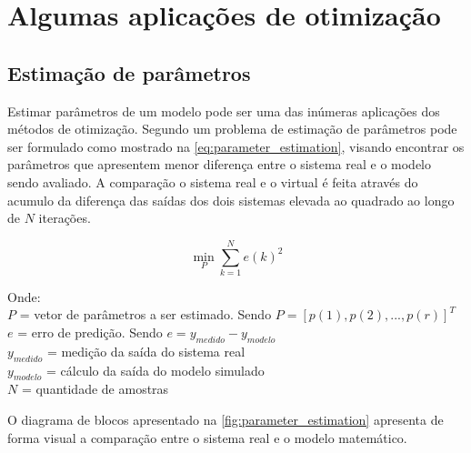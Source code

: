 \section{Algumas aplicações de otimização}
\label{sec:aplicacoes_de_otimizacao}

\subsection{Estimação de parâmetros}
\label{subsec:estimacao_de_parametros}

Estimar parâmetros de um modelo pode ser uma das inúmeras aplicações dos métodos de otimização.
Segundo  um problema de estimação de parâmetros pode ser formulado
como mostrado na \cref{eq:parameter_estimation}, visando encontrar os parâmetros que
apresentem menor diferença entre o sistema real e o modelo sendo avaliado.
A comparação o sistema real e o virtual é feita através do acumulo da diferença das saídas dos
dois sistemas elevada ao quadrado ao longo de $N$ iterações.

\begin{equation}
	\label{eq:parameter_estimation}
	\min_{P} \sum_{k=1}^{N} e(k)^2
\end{equation}

\noindent
Onde: \\
$P$ = vetor de parâmetros a ser estimado. Sendo $ P = [p(1), p(2), ..., p(r)]^T $ \\
$e$ = erro de predição. Sendo $ e = y_{medido} - y_{modelo} $ \\
$ y_{medido} $ = medição da saída do sistema real \\
$ y_{modelo} $ = cálculo da saída do modelo simulado \\
$ N $ = quantidade de amostras
\newline

O diagrama de blocos apresentado na \cref{fig:parameter_estimation} apresenta de forma
visual a comparação entre o sistema real e o modelo matemático.

